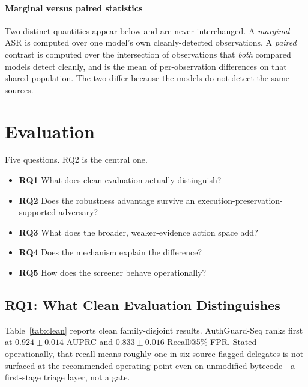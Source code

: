 \documentclass[conference]{IEEEtran}
\begin{document}
\paragraph*{Marginal versus paired statistics} Two distinct quantities appear below and are never interchanged. A \emph{marginal} ASR is computed over one model's own cleanly-detected observations. A \emph{paired} contrast is computed over the intersection of observations that \emph{both} compared models detect cleanly, and is the mean of per-observation differences on that shared population. The two differ because the models do not detect the same sources.

\section{Evaluation}
\label{sec:evaluation}

Five questions. RQ2 is the central one.

\begin{itemize}
\item \textbf{RQ1} What does clean evaluation actually distinguish?
\item \textbf{RQ2} Does the robustness advantage survive an execution-preservation-supported adversary?
\item \textbf{RQ3} What does the broader, weaker-evidence action space add?
\item \textbf{RQ4} Does the mechanism explain the difference?
\item \textbf{RQ5} How does the screener behave operationally?
\end{itemize}

\subsection{RQ1: What Clean Evaluation Distinguishes}
\label{sec:rq1}

Table~\ref{tab:clean} reports clean family-disjoint results. AuthGuard-Seq ranks first at $0.924\pm0.014$ AUPRC and $0.833\pm0.016$ Recall@5\% FPR. Stated operationally, that recall means roughly one in six source-flagged delegates is not surfaced at the recommended operating point even on unmodified bytecode---a first-stage triage layer, not a gate.
\end{document}
